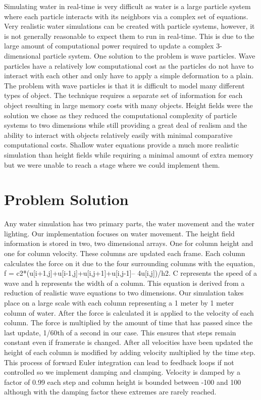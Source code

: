 \documentclass[12pt,titlepage]{article}
\begin{document}
Simulating water in real-time is very difficult as water is a large particle system where each particle interacts with its neighbors via a complex set of equations.  Very realistic water simulations can be created with particle systems, however, it is not generally reasonable to expect them to run in real-time.  This is due to the large amount of computational power required to update a complex 3-dimensional particle system.  One solution to the problem is wave particles.  Wave particles have a relatively low computational cost as the particles do not have to interact with each other and only have to apply a simple deformation to a plain.  The problem with wave particles is that it is difficult to model many different types of object.  The technique requires a separate set of information for each object resulting in large memory costs with many objects.  Height fields were the solution we chose as they reduced the computational complexity of particle systems to two dimensions while still providing a great deal of realism and the ability to interact with objects relatively easily with minimal comparative computational costs.  Shallow water equations provide a much more realistic simulation than height fields while requiring a minimal amount of extra memory but we were unable to reach a stage where we could implement them.
 
\section{Problem Solution}

Any water simulation has two primary parts, the water movement and the water lighting.  Our implementation focuses on water movement.  The height field information is stored in two, two dimensional arrays.  One for column height and one for column velocity.  These columns are updated each frame.  Each column calculates the force on it due to the four surrounding columns with the equation, f = c2*(u[i+1,j]+u[i-1,j]+u[i,j+1]+u[i,j-1]– 4u[i,j])/h2.  C represents the speed of a wave and h represents the width of a column.  This equation is derived from a reduction of realistic wave equations to two dimensions.  Our simulation takes place on a large scale with each column representing a 1 meter by 1 meter column of water.  After the force is calculated it is applied to the velocity of each column.  The force is multiplied by the amount of time that has passed since the last update, 1/60th of a second in our case.  This ensures that steps remain constant even if framerate is changed.  After all velocities have been updated the height of each column is modified by adding velocity multiplied by the time step.  This process of forward Euler integration can lead to feedback loops if not controlled so we implement damping and clamping.  Velocity is damped by a factor of 0.99 each step and column height is bounded between -100 and 100 although with the damping factor these extremes are rarely reached.
	
\end{document}
